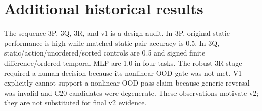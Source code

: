 \section{Additional historical results}
The sequence 3P, 3Q, 3R, and v1 is a design audit. In 3P, original static performance is high while matched static pair accuracy is 0.5. In 3Q, static/action/unordered/sorted controls are 0.5 and signed finite difference/ordered temporal MLP are 1.0 in four tasks. The robust 3R stage required a human decision because its nonlinear OOD gate was not met. V1 explicitly cannot support a nonlinear-OOD-pass claim because generic reversal was invalid and C20 candidates were degenerate. These observations motivate v2; they are not substituted for final v2 evidence.

